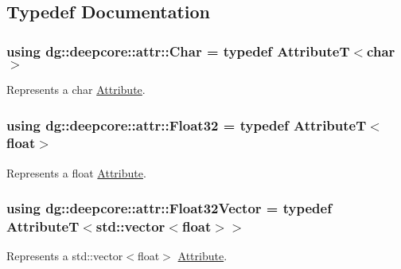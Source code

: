 \subsection{Typedef Documentation}
\subsubsection[{\texorpdfstring{Char}{Char}}]{\setlength{\rightskip}{0pt plus 5cm}using {\bf dg\+::deepcore\+::attr\+::\+Char} = typedef AttributeT$<$char$>$}\hypertarget{group___process_attributes_gadac20aec5181f1e94408c0a195f5515a}{}\label{group___process_attributes_gadac20aec5181f1e94408c0a195f5515a}


Represents a {\ttfamily char} \hyperlink{classdg_1_1deepcore_1_1_attribute}{Attribute}. 

\subsubsection[{\texorpdfstring{Float32}{Float32}}]{\setlength{\rightskip}{0pt plus 5cm}using {\bf dg\+::deepcore\+::attr\+::\+Float32} = typedef AttributeT$<$float$>$}\hypertarget{group___process_attributes_ga61b8924d2ea1e93844df63eab076eccc}{}\label{group___process_attributes_ga61b8924d2ea1e93844df63eab076eccc}


Represents a {\ttfamily float} \hyperlink{classdg_1_1deepcore_1_1_attribute}{Attribute}. 

\subsubsection[{\texorpdfstring{Float32\+Vector}{Float32Vector}}]{\setlength{\rightskip}{0pt plus 5cm}using {\bf dg\+::deepcore\+::attr\+::\+Float32\+Vector} = typedef AttributeT$<$std\+::vector$<$float$>$$>$}\hypertarget{group___process_attributes_ga79d0a6a07b8df1271460f9f6dd57ce57}{}\label{group___process_attributes_ga79d0a6a07b8df1271460f9f6dd57ce57}


Represents a {\ttfamily std\+::vector$<$float$>$} \hyperlink{classdg_1_1deepcore_1_1_attribute}{Attribute}. 

